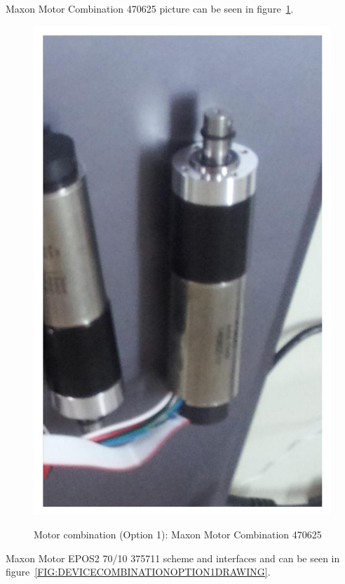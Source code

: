 Maxon Motor Combination 470625 picture can be seen in figure~\ref{FIG:DEVICECOMBINATIONOPTION1}.
\begin{figure}
  \centering
  \includegraphics[angle=90,width=1\columnwidth]{figs/body02/FIGDEVICECOMBINATIONOPTION1.pdf}\\
  \caption[Motor combination (Option 1): Maxon Motor Combination 470625]{Motor combination (Option 1): Maxon Motor Combination 470625}
  \label{FIG:DEVICECOMBINATIONOPTION1}
\end{figure}
Maxon Motor EPOS2 70/10 375711 scheme and interfaces and can be seen in figure~\ref{FIG:DEVICECOMBINATIONOPTION1DRAWING}.
